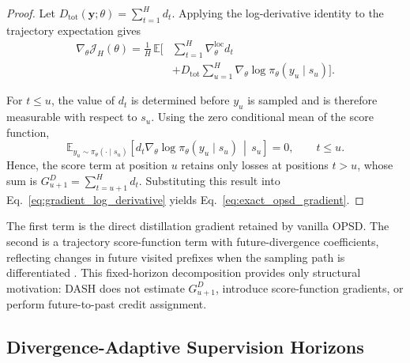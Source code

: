 \documentclass[letterpaper]{article} %
\begin{document}
\begin{proof}
Let
\(
D_{\mathrm{tot}}(\mathbf y;\theta)
=
\sum_{t=1}^{H}d_t
\).
Applying the log-derivative identity
\cite{williams1992reinforce,sutton1999policygradient}
to the trajectory expectation gives
\begin{equation}
\begin{split}
    \nabla_\theta\mathcal J_H(\theta)
    =
    \frac{1}{H}\,
    \mathbb E\Bigg[
        &\sum_{t=1}^{H}
        \nabla_\theta^{\mathrm{loc}}d_t
        \\
        &+
        D_{\mathrm{tot}}
        \sum_{u=1}^{H}
        \nabla_\theta
        \log\pi_\theta(y_u\mid s_u)
    \Bigg].
    \label{eq:gradient_log_derivative}
\end{split}
\end{equation}

For $t\leq u$, the value of $d_t$ is determined before $y_u$
is sampled and is therefore measurable with respect to $s_u$.
Using the zero conditional mean of the score function,
\begin{equation}
\mathbb E_{y_u\sim\pi_\theta(\cdot\mid s_u)}
\left[
    d_t
    \nabla_\theta\log\pi_\theta(y_u\mid s_u)
    \,\middle|\,
    s_u
\right]
=
0,
\qquad t\leq u.
\label{eq:causal_score_cancellation}
\end{equation}
Hence, the score term at position $u$ retains only losses at
positions $t>u$, whose sum is
$G^D_{u+1}=\sum_{t=u+1}^{H}d_t$.
Substituting this result into
Eq.~\eqref{eq:gradient_log_derivative}
yields Eq.~\eqref{eq:exact_opsd_gradient}.
\end{proof}

The first term is the direct distillation gradient retained by vanilla
OPSD. The second is a trajectory score-function term with
future-divergence coefficients, reflecting changes in future visited
prefixes when the sampling path is differentiated
\cite{ross2011dagger,bengio2015scheduled}. This fixed-horizon
decomposition provides only structural motivation: DASH does not
estimate $G^D_{u+1}$, introduce score-function gradients, or perform
future-to-past credit assignment.


\subsection{Divergence-Adaptive Supervision Horizons}
\label{sec:dash}
\end{document}
